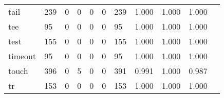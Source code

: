 \begin{longtable}{lp{1.2cm}p{1.2cm}p{1.2cm}p{1.2cm}p{1.2cm}p{1.2cm}p{1.2cm}p{1.2cm}p{1.2cm}p{1.2cm}}
tail      &                                   239 &                                                  0 &                                                  0 &                                                  0 &                                                  0 &                                                239 &                                         1.000 &                                              1.000 &                                              1.000 \\
tee       &                                    95 &                                                  0 &                                                  0 &                                                  0 &                                                  0 &                                                 95 &                                         1.000 &                                              1.000 &                                              1.000 \\
test      &                                   155 &                                                  0 &                                                  0 &                                                  0 &                                                  0 &                                                155 &                                         1.000 &                                              1.000 &                                              1.000 \\
timeout   &                                    95 &                                                  0 &                                                  0 &                                                  0 &                                                  0 &                                                 95 &                                         1.000 &                                              1.000 &                                              1.000 \\
touch     &                                   396 &                                                  0 &                                                  5 &                                                  0 &                                                  0 &                                                391 &                                         0.991 &                                              1.000 &                                              0.987 \\
tr        &                                   153 &                                                  0 &                                                  0 &                                                  0 &                                                  0 &                                                153 &                                         1.000 &                                              1.000 &                                              1.000 \\

\end{longtable}
